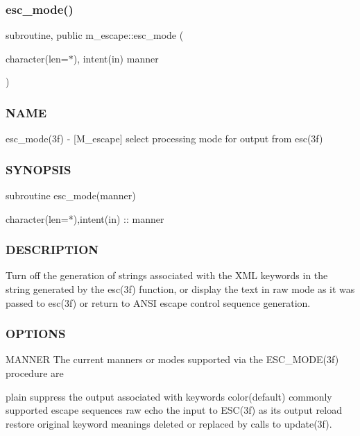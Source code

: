 \subsubsection{\texorpdfstring{esc\+\_\+mode()}{esc\_mode()}}
{\footnotesize\ttfamily subroutine, public m\+\_\+escape\+::esc\+\_\+mode (\begin{DoxyParamCaption}\item[{character(len=$\ast$), intent(in)}]{manner }\end{DoxyParamCaption})}



\subsubsection*{N\+A\+ME}

esc\+\_\+mode(3f) -\/ \mbox{[}M\+\_\+escape\mbox{]} select processing mode for output from esc(3f) 

\subsubsection*{S\+Y\+N\+O\+P\+S\+IS}

\begin{DoxyVerb}subroutine esc_mode(manner)

   character(len=*),intent(in) :: manner
\end{DoxyVerb}


\subsubsection*{D\+E\+S\+C\+R\+I\+P\+T\+I\+ON}

Turn off the generation of strings associated with the X\+ML keywords in the string generated by the esc(3f) function, or display the text in raw mode as it was passed to esc(3f) or return to A\+N\+SI escape control sequence generation.

\subsubsection*{O\+P\+T\+I\+O\+NS}

M\+A\+N\+N\+ER The current manners or modes supported via the E\+S\+C\+\_\+\+M\+O\+D\+E(3f) procedure are

plain suppress the output associated with keywords color(default) commonly supported escape sequences raw echo the input to E\+S\+C(3f) as its output reload restore original keyword meanings deleted or replaced by calls to update(3f).

